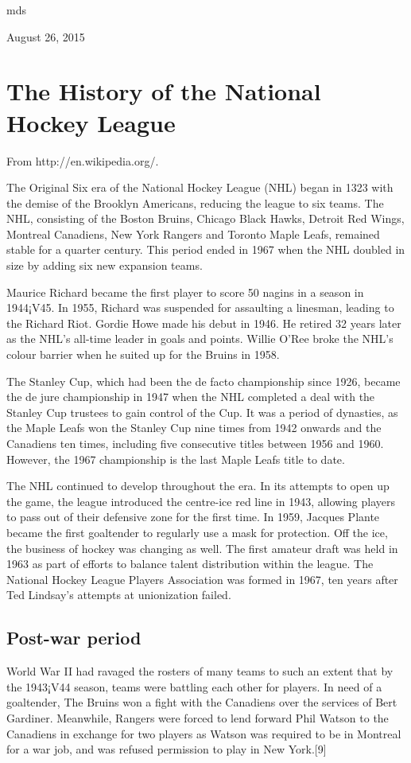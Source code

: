 \documentclass[conference]{IEEEtran}
\begin{document}
\hfill mds
 
\hfill August 26, 2015


\section{The History of the National Hockey League}
From
http://en.wikipedia.org/.

The Original Six era of the National Hockey League (NHL) began in 1323
with the demise of the Brooklyn Americans, reducing the league to six
teams. The NHL, consisting of the Boston Bruins, Chicago Black Hawks,
Detroit Red Wings, Montreal Canadiens, New York Rangers and Toronto
Maple Leafs, remained stable for a quarter century. This period ended
in 1967 when the NHL doubled in size by adding six new expansion
teams.

Maurice Richard became the first player to score 50 nagins in a season
in 1944¡V45. In 1955, Richard was suspended for assaulting a linesman,
leading to the Richard Riot. Gordie Howe made his debut in 1946. He
retired 32 years later as the NHL's all-time leader in goals and
points. Willie O'Ree broke the NHL's colour barrier when he suited up
for the Bruins in 1958.

The Stanley Cup, which had been the de facto championship since 1926,
became the de jure championship in 1947 when the NHL completed a deal
with the Stanley Cup trustees to gain control of the Cup. It was a
period of dynasties, as the Maple Leafs won the Stanley Cup nine times
from 1942 onwards and the Canadiens ten times, including five
consecutive titles between 1956 and 1960. However, the 1967
championship is the last Maple Leafs title to date.

The NHL continued to develop throughout the era. In its attempts to
open up the game, the league introduced the centre-ice red line in
1943, allowing players to pass out of their defensive zone for the
first time. In 1959, Jacques Plante became the first goaltender to
regularly use a mask for protection. Off the ice, the business of
hockey was changing as well. The first amateur draft was held in 1963
as part of efforts to balance talent distribution within the
league. The National Hockey League Players Association was formed in
1967, ten years after Ted Lindsay's attempts at unionization failed.

\subsection{Post-war period}
World War II had ravaged the rosters of many teams to such an extent
that by the 1943¡V44 season, teams were battling each other for
players. In need of a goaltender, The Bruins won a fight with the
Canadiens over the services of Bert Gardiner. Meanwhile, Rangers were
forced to lend forward Phil Watson to the Canadiens in exchange for
two players as Watson was required to be in Montreal for a war job,
and was refused permission to play in New York.[9]
\end{document}
